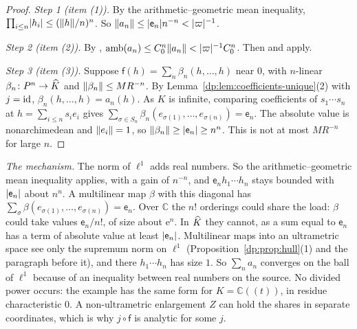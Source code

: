 \begin{proof}
\emph{Step 1 (item (1)).} By the arithmetic--geometric mean inequality, $\prod_{i\le n}\lvert h_i\rvert\le(\lVert h\rVert/n)^n$. So $\lVert a_n\rVert\le\lvert \mathsf e_n\rvert n^{-n}<\lvert \varpi\rvert^{-1}$.

\emph{Step 2 (item (2)).} By \cite[Theorem~14.39(2)]{I}, $\operatorname{amb}(a_n)\le C_0^n\lVert a_n\rVert<\lvert \varpi\rvert^{-1}C_0^n$. Then \cite[Proposition~14.9(1)]{I} and \cite[Remark~14.13]{I} apply.

\emph{Step 3 (item (3)).} Suppose $\mathsf f(h)=\sum_n\beta_n(h,\dots,h)$ near $0$, with $n$-linear $\beta_n\colon P^n\to\widehat K$ and $\lVert \beta_n\rVert\le MR^{-n}$. By Lemma~\ref{dp:lem:coefficients-unique}(2) with $j=\mathrm{id}$, $\beta_n(h,\dots,h)=a_n(h)$. As $K$ is infinite, comparing coefficients of $s_1\cdots s_n$ at $h=\sum_{i\le n}s_ie_i$ gives $\sum_{\sigma\in S_n}\beta_n(e_{\sigma(1)},\dots,e_{\sigma(n)})=\mathsf e_n$. The absolute value is nonarchimedean and $\lVert e_i\rVert=1$, so $\lVert \beta_n\rVert\ge\lvert \mathsf e_n\rvert\ge n^n$. This is not at most $MR^{-n}$ for large $n$.
\end{proof}

\emph{The mechanism.} The norm of $\ell^1$ adds real numbers. So the arithmetic--geometric mean inequality applies, with a gain of $n^{-n}$, and $\mathsf e_nh_1\cdots h_n$ stays bounded with $\lvert \mathsf e_n\rvert$ about $n^n$. A multilinear map $\beta$ with this diagonal has $\sum_\sigma\beta(e_{\sigma(1)},\dots,e_{\sigma(n)})=\mathsf e_n$. Over $\mathbb C$ the $n!$ orderings could share the load: $\beta$ could take values $\mathsf e_n/n!$, of size about $\mathrm e^n$. In $\widehat K$ they cannot, as a sum equal to $\mathsf e_n$ has a term of absolute value at least $\lvert \mathsf e_n\rvert$. Multilinear maps into an ultrametric space see only the supremum norm on $\ell^1$ (Proposition~\ref{dp:prop:hull}(1) and the paragraph before it), and there $h_1\cdots h_n$ has size $1$. So $\sum_na_n$ converges on the ball of $\ell^1$ because of an inequality between real numbers on the source. No divided power occurs: the example has the same form for $K=\mathbb C((t))$, in residue characteristic $0$. A non-ultrametric enlargement $Z$ can hold the shares in separate coordinates, which is why $j\circ\mathsf f$ is analytic for some $j$.

